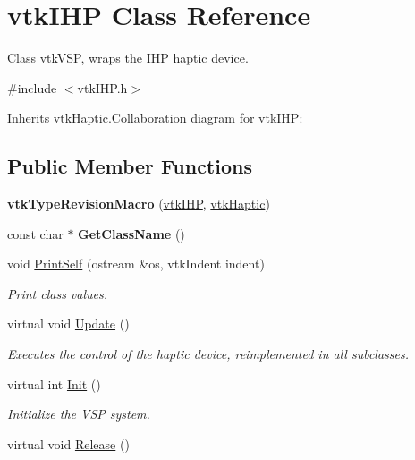 \hypertarget{classvtkIHP}{
\section{vtkIHP Class Reference}
\label{classvtkIHP}
}


Class \hyperlink{classvtkVSP}{vtkVSP}, wraps the IHP haptic device.  


{\ttfamily \#include $<$vtkIHP.h$>$}

Inherits \hyperlink{classvtkHaptic}{vtkHaptic}.Collaboration diagram for vtkIHP:\subsection*{Public Member Functions}
\begin{DoxyCompactItemize}
\item 
\hypertarget{classvtkIHP_a00411adcf823417149c18bb208d31d4b}{
{\bfseries vtkTypeRevisionMacro} (\hyperlink{classvtkIHP}{vtkIHP}, \hyperlink{classvtkHaptic}{vtkHaptic})}
\label{classvtkIHP_a00411adcf823417149c18bb208d31d4b}

\item 
\hypertarget{classvtkIHP_a807bb9b0218e7d62682ff1c443c14888}{
const char $\ast$ {\bfseries GetClassName} ()}
\label{classvtkIHP_a807bb9b0218e7d62682ff1c443c14888}

\item 
\hypertarget{classvtkIHP_a9f7937146d91110b7dfae3eb7712fcca}{
void \hyperlink{classvtkIHP_a9f7937146d91110b7dfae3eb7712fcca}{PrintSelf} (ostream \&os, vtkIndent indent)}
\label{classvtkIHP_a9f7937146d91110b7dfae3eb7712fcca}

\begin{DoxyCompactList}\small\item\em Print class values. \item\end{DoxyCompactList}\item 
virtual void \hyperlink{classvtkIHP_a0777ce95f933e80ccfb47f4ebadcf1ec}{Update} ()
\begin{DoxyCompactList}\small\item\em Executes the control of the haptic device, reimplemented in all subclasses. \item\end{DoxyCompactList}\item 
virtual int \hyperlink{classvtkIHP_a055cc6c8150236aa3899647e32c3a0da}{Init} ()
\begin{DoxyCompactList}\small\item\em Initialize the VSP system. \item\end{DoxyCompactList}\item 
\hypertarget{classvtkIHP_a7b0ac0f3e862d015fa3f27489679aad3}{
virtual void \hyperlink{classvtkIHP_a7b0ac0f3e862d015fa3f27489679aad3}{Release} ()}
\label{classvtkIHP_a7b0ac0f3e862d015fa3f27489679aad3}


\end{DoxyCompactItemize}
